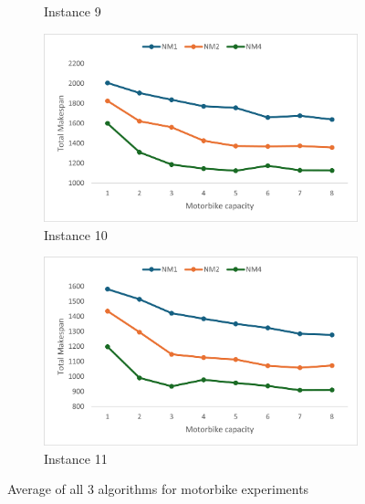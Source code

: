 \documentclass{article}
\begin{document}
\begin{figure}[h]
\begin{subfigure}{0.33\textwidth}
			\caption{Instance 9}
			\label{fig:p09_avg}
		\end{subfigure}
		\par
		\bigskip
		\begin{subfigure}{0.33\textwidth}
			\centering
			\includegraphics[scale=0.42]{Instance10}\;
			\caption{Instance 10}
			\label{fig:p10_avg}
		\end{subfigure}
		\begin{subfigure}{0.33\textwidth}
			\centering
			\includegraphics[scale=0.42]{Instance11}\;
			\caption{Instance 11}
			\label{fig:p11_avg}
		\end{subfigure}
		\caption{Average of all 3 algorithms for motorbike experiments}
		\label{fig:motorbike_averages}
	\end{figure}
	
\end{document}
